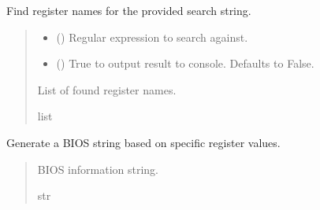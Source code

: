 \documentclass[letterpaper,10pt,english]{sphinxmanual}
\begin{document}
\begin{fulllineitems}
\begin{fulllineitems}
\end{fulllineitems}



\begin{fulllineitems}

\pysigstartsignatures
{}
\pysigstopsignatures
\sphinxAtStartPar
Find register names for the provided search string.
\begin{quote}\begin{description}
\begin{itemize}
\item {} 
\sphinxAtStartPar
{} () \textendash{} Regular expression to search against.

\item {} 
\sphinxAtStartPar
{} (\sphinxstyleliteralemphasis{\sphinxupquote{, }}) \textendash{} True to output result to console. Defaults to False.

\end{itemize}

\sphinxAtStartPar
List of found register names.

\sphinxAtStartPar
list

\end{description}\end{quote}

\end{fulllineitems}



\begin{fulllineitems}

\pysigstartsignatures
{}
\pysigstopsignatures
\sphinxAtStartPar
Generate a BIOS string based on specific register values.
\begin{quote}\begin{description}
\sphinxAtStartPar
BIOS information string.

\sphinxAtStartPar
str


\end{description}
\end{quote}
\end{fulllineitems}
\end{fulllineitems}
\end{document}
